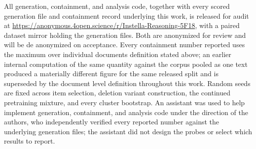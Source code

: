\documentclass{article}
\begin{document}
All generation, containment, and analysis code, together with every scored generation
file and containment record underlying this work, is released for audit at
\url{https://anonymous.4open.science/r/Instella-Reasoning-5F18}, with a paired dataset
mirror holding the generation files. Both are anonymized for review and will be
de anonymized on acceptance. Every containment number reported uses the maximum over
individual documents definition stated above; an earlier internal computation of the
same quantity against the corpus pooled as one text produced a materially different
figure for the same released split and is superseded by the document level definition
throughout this work. Random seeds are fixed across item selection, deletion variant
construction, the continued pretraining mixture, and every cluster bootstrap. An
assistant was used to help implement generation, containment, and analysis code under
the direction of the authors, who independently verified every reported number against
the underlying generation files; the assistant did not design the probes or select which
results to report.

\newpage

\end{document}
